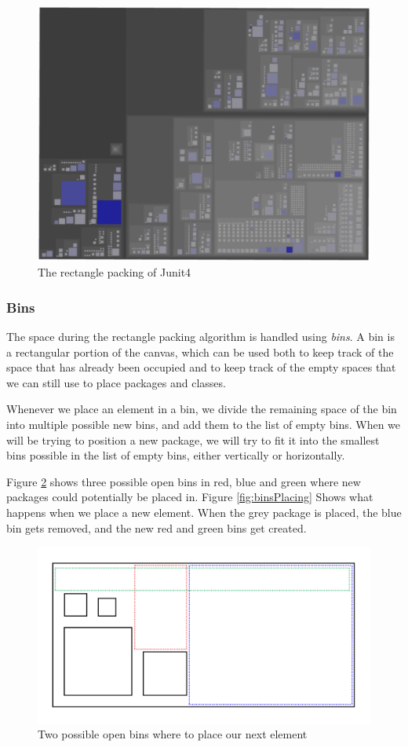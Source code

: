 \documentclass[]{usiinfbachelorproject}
\begin{document}
\begin{figure} [H]
\centering
\includegraphics[width=.7\textwidth]{pictures/junit4Above.png}
\caption{The rectangle packing of Junit4}
\label{fig:rectanglePacking}
\end{figure}

\subsubsection{Bins} \label{Bins}
The space during the rectangle packing algorithm is handled using \textit{bins}. A bin is a rectangular portion of the canvas, which can be used both to keep track of the space that has already been occupied and to keep track of the empty spaces that we can still use to place packages and classes.

Whenever we place an element in a bin, we divide the remaining space of the bin into multiple possible new bins, and add them to the list of empty bins. When we will be trying to position a new package, we will try to fit it into the smallest bins possible in the list of empty bins, either vertically or horizontally.

Figure \ref{fig:bins} shows three possible open bins in red, blue and green where new packages could potentially be placed in. Figure \ref{fig:binsPlacing} Shows what happens when we place a new element. When the grey package is placed, the blue bin gets removed, and the new red and green bins get created.

\begin{figure} [H]
\centering
\includegraphics[width=.7\textwidth]{pictures/bins.png}
\caption{Two possible open bins where to place our next element}
\label{fig:bins}
\end{figure}
\end{document}
